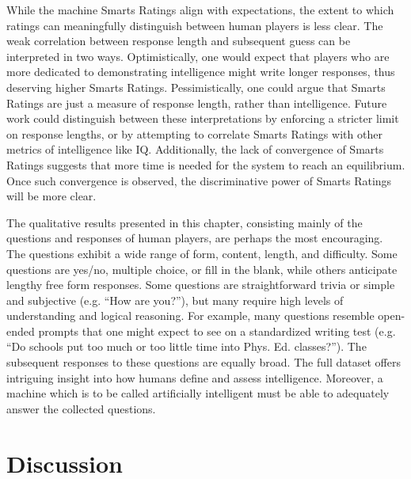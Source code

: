 While the machine Smarts Ratings align with expectations, the extent to which ratings can meaningfully distinguish between human players is less clear. The weak correlation between response length and subsequent guess can be interpreted in two ways. Optimistically, one would expect that players who are more dedicated to demonstrating intelligence might write longer responses, thus deserving higher Smarts Ratings. Pessimistically, one could argue that Smarts Ratings are just a measure of response length, rather than intelligence. Future work could distinguish between these interpretations by enforcing a stricter limit on response lengths, or by attempting to correlate Smarts Ratings with other metrics of intelligence like IQ. Additionally, the lack of convergence of Smarts Ratings suggests that more time is needed for the system to reach an equilibrium. Once such convergence is observed, the discriminative power of Smarts Ratings will be more clear.

The qualitative results presented in this chapter, consisting mainly of the questions and responses of human players, are perhaps the most encouraging. The questions exhibit a wide range of form, content, length, and difficulty. Some questions are yes/no, multiple choice, or fill in the blank, while others anticipate lengthy free form responses. Some questions are straightforward trivia or simple and subjective (e.g. ``How are you?''), but many require high levels of understanding and logical reasoning. For example, many questions resemble open-ended prompts that one might expect to see on a standardized writing test (e.g. ``Do schools put too much or too little time into Phys. Ed. classes?''). The subsequent responses to these questions are equally broad. The full dataset offers intriguing insight into how humans define and assess intelligence. Moreover, a machine which is to be called artificially intelligent must be able to adequately answer the collected questions.

\section{Discussion}

